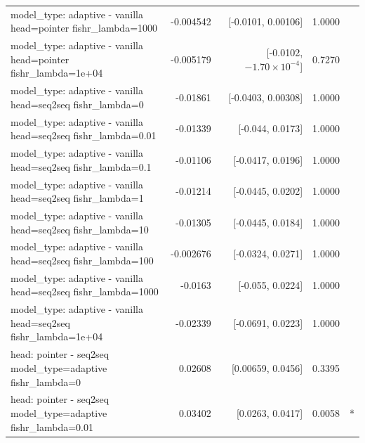 \documentclass[10pt]{article}
\makeatletter
\newcommand{\stackcell}[1]{\begin{tabular}[t]{@{}l@{}}#1\end{tabular}}
\makeatother
\begin{document}
{\begin{longtable}{lrrrl}
\stackcell{model\_type: adaptive - vanilla\\\footnotesize head=pointer fishr\_lambda=1000 } & -0.004542 & [-0.0101, 0.00106] & 1.0000 & \\
\stackcell{model\_type: adaptive - vanilla\\\footnotesize head=pointer fishr\_lambda=1e+04 } & -0.005179 & [-0.0102, $-1.70\times10^{-4}$] & 0.7270 & \\
\stackcell{model\_type: adaptive - vanilla\\\footnotesize head=seq2seq fishr\_lambda=0 } & -0.01861 & [-0.0403, 0.00308] & 1.0000 & \\
\stackcell{model\_type: adaptive - vanilla\\\footnotesize head=seq2seq fishr\_lambda=0.01 } & -0.01339 & [-0.044, 0.0173] & 1.0000 & \\
\stackcell{model\_type: adaptive - vanilla\\\footnotesize head=seq2seq fishr\_lambda=0.1 } & -0.01106 & [-0.0417, 0.0196] & 1.0000 & \\
\stackcell{model\_type: adaptive - vanilla\\\footnotesize head=seq2seq fishr\_lambda=1 } & -0.01214 & [-0.0445, 0.0202] & 1.0000 & \\
\stackcell{model\_type: adaptive - vanilla\\\footnotesize head=seq2seq fishr\_lambda=10 } & -0.01305 & [-0.0445, 0.0184] & 1.0000 & \\
\stackcell{model\_type: adaptive - vanilla\\\footnotesize head=seq2seq fishr\_lambda=100 } & -0.002676 & [-0.0324, 0.0271] & 1.0000 & \\
\stackcell{model\_type: adaptive - vanilla\\\footnotesize head=seq2seq fishr\_lambda=1000 } & -0.0163 & [-0.055, 0.0224] & 1.0000 & \\
\stackcell{model\_type: adaptive - vanilla\\\footnotesize head=seq2seq fishr\_lambda=1e+04 } & -0.02339 & [-0.0691, 0.0223] & 1.0000 & \\
\stackcell{head: pointer - seq2seq\\\footnotesize model\_type=adaptive fishr\_lambda=0 } & 0.02608 & [0.00659, 0.0456] & 0.3395 & \\
\stackcell{head: pointer - seq2seq\\\footnotesize model\_type=adaptive fishr\_lambda=0.01 } & 0.03402 & [0.0263, 0.0417] & 0.0058 & *\\

\end{longtable}}
\end{document}
